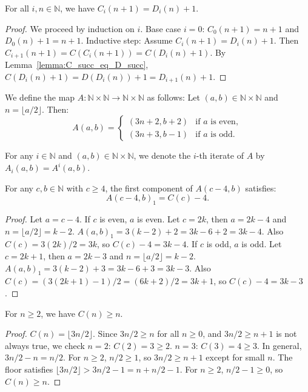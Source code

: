 \begin{lemma}
  \label{lemma:Citer_succ_eq_Diter_succ}
  \leanok
  For all $i, n \in \mathbb{N}$, we have $C_i(n+1) = D_i(n) + 1$.
  \begin{proof}
    \leanok
    We proceed by induction on $i$.
    Base case $i=0$: $C_0(n+1) = n+1$ and $D_0(n)+1 = n+1$.
    Inductive step: Assume $C_i(n+1) = D_i(n) + 1$. Then
    $C_{i+1}(n+1) = C(C_i(n+1)) = C(D_i(n) + 1)$.
    By Lemma~\ref{lemma:C_succ_eq_D_succ}, $C(D_i(n) + 1) = D(D_i(n)) + 1 = D_{i+1}(n) + 1$.
  \end{proof}
\end{lemma}

\begin{definition}
  \label{def:A}
  \leanok
  We define the map $A: \mathbb{N} \times \mathbb{N} \to \mathbb{N} \times \mathbb{N}$ as follows:
  Let $(a, b) \in \mathbb{N} \times \mathbb{N}$ and $n = \lfloor a/2 \rfloor$. Then:
  \[
  A(a, b) = \begin{cases}
    (3n+2, b+2) & \text{if } a \text{ is even}, \\
    (3n+3, b-1) & \text{if } a \text{ is odd}.
  \end{cases}
  \]
\end{definition}

\begin{definition}
  \label{def:Aiter}
  \leanok
  For any $i \in \mathbb{N}$ and $(a, b) \in \mathbb{N} \times \mathbb{N}$, we denote the $i$-th iterate of $A$ by $A_i(a, b) = A^i(a, b)$.
\end{definition}

\begin{lemma}
  \label{lemma:A_fst}
  \leanok
  For any $c, b \in \mathbb{N}$ with $c \geq 4$, the first component of $A(c-4, b)$ satisfies:
  \[ A(c-4, b)_1 = C(c) - 4. \]
  \begin{proof}
    \leanok
    Let $a = c-4$. If $c$ is even, $a$ is even. Let $c=2k$, then $a=2k-4$ and $n = \lfloor a/2 \rfloor = k-2$.
    $A(a, b)_1 = 3(k-2)+2 = 3k-6+2 = 3k-4$.
    Also $C(c) = 3(2k)/2 = 3k$, so $C(c)-4 = 3k-4$.
    If $c$ is odd, $a$ is odd. Let $c=2k+1$, then $a=2k-3$ and $n = \lfloor a/2 \rfloor = k-2$.
    $A(a, b)_1 = 3(k-2)+3 = 3k-6+3 = 3k-3$.
    Also $C(c) = (3(2k+1)-1)/2 = (6k+2)/2 = 3k+1$, so $C(c)-4 = 3k-3$.
  \end{proof}
\end{lemma}

\begin{lemma}
  \label{lemma:C_ge_self}
  \leanok
  For $n \geq 2$, we have $C(n) \geq n$.
  \begin{proof}
    \leanok
    $C(n) = \lfloor 3n/2 \rfloor$. Since $3n/2 \geq n$ for all $n \geq 0$, and $3n/2 \geq n+1$ is not always true,
    we check $n=2$: $C(2)=3 \geq 2$. $n=3$: $C(3)=4 \geq 3$.
    In general, $3n/2 - n = n/2$. For $n \geq 2$, $n/2 \geq 1$, so $3n/2 \geq n+1$ except for small $n$.
    The floor satisfies $\lfloor 3n/2 \rfloor > 3n/2 - 1 = n + n/2 - 1$.
    For $n \geq 2$, $n/2 - 1 \geq 0$, so $C(n) \geq n$.
  \end{proof}
\end{lemma}


